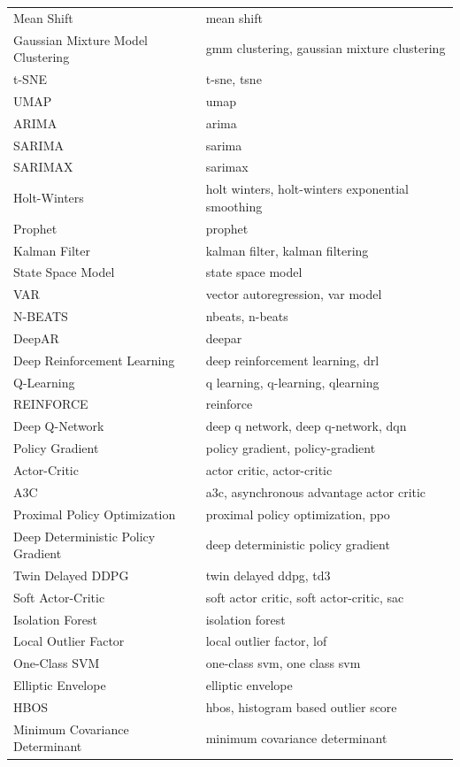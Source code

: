 \begin{xltabular}{\textwidth}{lX}
Mean Shift & mean shift \\
Gaussian Mixture Model Clustering & gmm clustering, gaussian mixture clustering \\
t-SNE & t-sne, tsne \\
UMAP & umap \\
\addlinespace
ARIMA & arima \\
SARIMA & sarima \\
SARIMAX & sarimax \\
Holt-Winters & holt winters, holt-winters exponential smoothing \\
Prophet & prophet \\
Kalman Filter & kalman filter, kalman filtering \\
State Space Model & state space model \\
VAR & vector autoregression, var model \\
N-BEATS & nbeats, n-beats \\
DeepAR & deepar \\
\addlinespace
Deep Reinforcement Learning & deep reinforcement learning, drl \\
Q-Learning & q learning, q-learning, qlearning \\
REINFORCE & reinforce \\
Deep Q-Network & deep q network, deep q-network, dqn \\
Policy Gradient & policy gradient, policy-gradient \\
Actor-Critic & actor critic, actor-critic \\
A3C & a3c, asynchronous advantage actor critic \\
Proximal Policy Optimization & proximal policy optimization, ppo \\
Deep Deterministic Policy Gradient & deep deterministic policy gradient \\
Twin Delayed DDPG & twin delayed ddpg, td3 \\
Soft Actor-Critic & soft actor critic, soft actor-critic, sac \\
\addlinespace
Isolation Forest & isolation forest \\
Local Outlier Factor & local outlier factor, lof \\
One-Class SVM & one-class svm, one class svm \\
Elliptic Envelope & elliptic envelope \\
HBOS & hbos, histogram based outlier score \\
Minimum Covariance Determinant & minimum covariance determinant \\

\end{xltabular}
